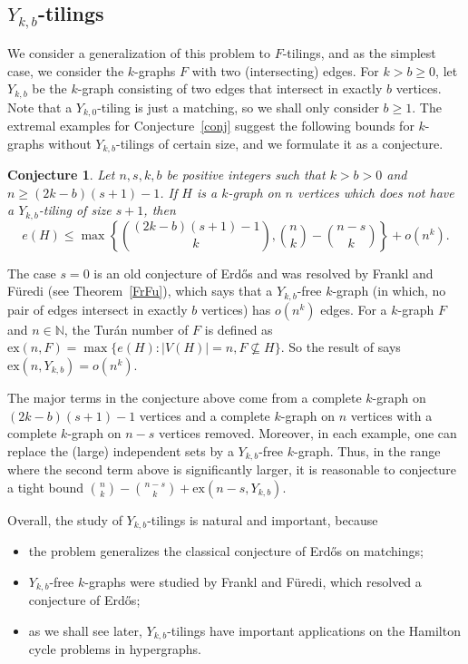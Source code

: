 \documentclass[11pt, reqno]{amsart}    	%
\newtheorem{conj}[thm]{Conjecture}
\theoremstyle{definition}
\numberwithin{equation}{section}
\begin{document}
	\subsection{$Y_{k,b}$-tilings}
	We consider a generalization of this problem to $F$-tilings, and as the simplest case, we consider the $k$-graphs $ F $ with two (intersecting) edges.
	For $k>b\ge 0$, let $Y_{k,b}$ be the $k$-graph consisting of two edges that intersect in exactly $b$ vertices. 
	Note that a $Y_{k,0}$-tiling is just a matching, so we shall only consider $b\ge 1$.
	The extremal examples for Conjecture~\ref{conj} suggest the following bounds for $k$-graphs without $Y_{k,b}$-tilings of certain size, and we formulate it as a conjecture.
	\begin{conj}
		\label{conj1}
		Let $ n,s,k,b $ be positive integers such that $ k>b>0$ and $ n \ge (2k-b)(s+1)-1$. 
		If $H$ is a $ k $-graph on $ n $ vertices which does not have a $Y_{k,b}$-tiling of size $s+1$, then
		\[ 
		e(H)\le \max \left \{ \binom{(2k-b)(s+1)-1}{k}, \binom{n}{k}-\binom{n-s}{k} \right \}+o(n^k). 
		\]
	\end{conj} 
	The case $ s=0$ is an old conjecture of Erd\H{o}s \cite{MR0409246} and was resolved by Frankl and F\"uredi \cite{Peter1985Forbidding} (see Theorem~\ref{FrFu}), which  says that a $Y_{k,b}$-free $k$-graph (in which, no pair of edges intersect in exactly $b$ vertices) has $o(n^k)$ edges.  For a $ k $-graph $ F $ and $ n\in \mathbb N $, the Tur\'an number of $ F $ is defined as $ \text{ex}(n, F)=\max\{e(H):|V(H)|=n, F\nsubseteq H\} $. So the result of \cite{Peter1985Forbidding} says $ \text{ex}(n,Y_{k,b})=o(n^k) $.

	The major terms in the conjecture above come from a complete $k$-graph on $(2k-b)(s+1)-1$ vertices and a  complete $k$-graph on $n$ vertices with a complete $k$-graph on $n-s$ vertices removed.
	Moreover, in each example, one can replace the (large) independent sets by a $Y_{k,b}$-free $k$-graph.
	Thus, in the range where the second term above is significantly larger, it is reasonable to conjecture a tight bound $\binom{n}{k}-\binom{n-s}{k}+\text{ex}(n-s, Y_{k,b})$.
	
	Overall, the study of $Y_{k,b}$-tilings is natural and important, because
	\begin{itemize}
		\item the problem generalizes the classical conjecture of Erd\H{o}s on matchings;
		\item $Y_{k,b}$-free $k$-graphs were studied by Frankl and F\"uredi, which resolved a conjecture of Erd\H{o}s;
		\item as we shall see later, $Y_{k,b}$-tilings have important applications on the Hamilton cycle problems in hypergraphs.
	\end{itemize}
	
\end{document}
